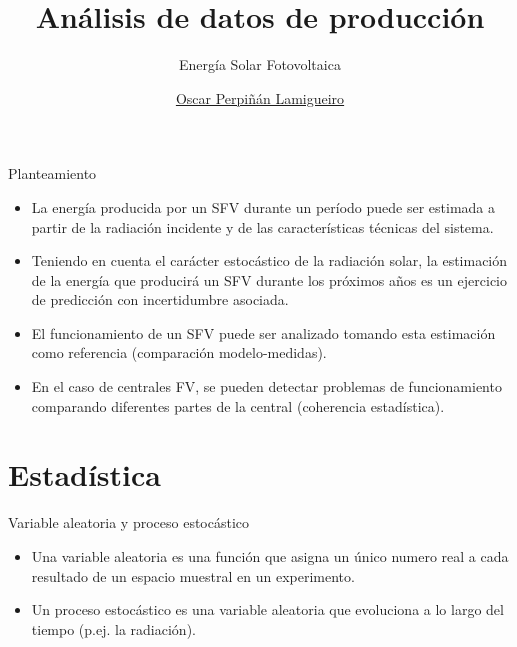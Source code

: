 \documentclass[aspectratio=169, usenames,svgnames,dvipsnames]{beamer}
\author{\href{https://oscarperpinan.github.io}{Oscar Perpiñán Lamigueiro}}
\date{}
\title{Análisis de datos de producción}
\subtitle{Energía Solar Fotovoltaica}
\institute[UPM]{Universidad Politécnica de Madrid}
\begin{document}
\maketitle

\begin{frame}[label={sec:orgfe92809}]{Planteamiento}
\begin{itemize}
\item La energía producida por un SFV durante un período puede ser estimada a partir de la radiación incidente y de las características técnicas del sistema.
\item Teniendo en cuenta el carácter estocástico de la radiación solar, la estimación de la energía que producirá un SFV durante los próximos años es un ejercicio de predicción con incertidumbre asociada.
\item El funcionamiento de un SFV puede ser analizado tomando esta estimación como referencia (\alert{comparación modelo-medidas}).
\item En el caso de centrales FV, se pueden detectar problemas de funcionamiento comparando diferentes partes de la central (\alert{coherencia estadística}).
\end{itemize}
\end{frame}

\section{Estadística}
\label{sec:orgca2dd95}


\begin{frame}[label={sec:org35dd387}]{Variable aleatoria y proceso estocástico}
\begin{itemize}
\item Una \alert{variable aleatoria} es una función que asigna un único numero
real a cada resultado de un espacio muestral en un experimento.
\item Un \alert{proceso estocástico} es una variable aleatoria que evoluciona a
lo largo del \alert{tiempo} (p.ej. la radiación).
\end{itemize}
\end{frame}
\end{document}
